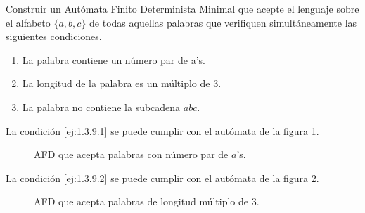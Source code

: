 \begin{ejercicio}\label{ej:1.3.9}
    Construir un Autómata Finito Determinista Minimal que acepte el lenguaje sobre el alfabeto $\{a,b,c\}$ de todas aquellas palabras que verifiquen simultáneamente las siguientes condiciones.
    \begin{enumerate}
        \item \label{ej:1.3.9.1}
        La palabra contiene un número par de a's.
        \item \label{ej:1.3.9.2}
        La longitud de la palabra es un múltiplo de 3.
        \item \label{ej:1.3.9.3}
        La palabra no contiene la subcadena $abc$.
    \end{enumerate}

    La condición \ref{ej:1.3.9.1} se puede cumplir con el autómata de la figura \ref{fig:1.3.9-AFD1}.
    \begin{figure}
        \centering
        \caption{AFD que acepta palabras con número par de $a$'s.}
        \label{fig:1.3.9-AFD1}
    \end{figure}

    La condición \ref{ej:1.3.9.2} se puede cumplir con el autómata de la figura \ref{fig:1.3.9-AFD2}.
    \begin{figure}
        \centering
        \caption{AFD que acepta palabras de longitud múltiplo de 3.}
        \label{fig:1.3.9-AFD2}
    \end{figure}


\end{ejercicio}
